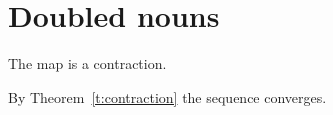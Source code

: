 \section{Doubled nouns}

\begin{theorem}
\label{t:contraction}
The map is a contraction.
\end{theorem}

By Theorem~\ref{t:contraction} the sequence converges.
